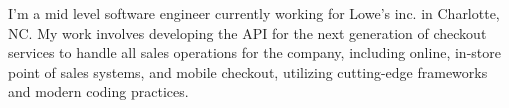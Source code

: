 

\begin{cvparagraph}



I'm a mid level software engineer currently working for Lowe's inc. in Charlotte, NC. My work involves developing the API for the next generation of checkout services to handle all sales operations for the company, including online, in-store point of sales systems, and mobile checkout, utilizing cutting-edge frameworks and modern coding practices.


\end{cvparagraph}
